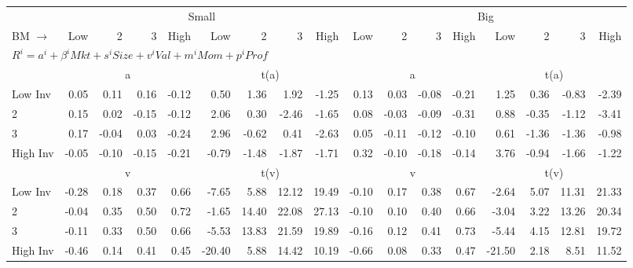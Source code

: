 
\begin{tabular}{lrrrrrrrrrrrrrrrr}
  \toprule
     & \multicolumn{8}{c}{Small} & \multicolumn{8}{c}{Big}  \\
     \cmidrule(r){2-9} \cmidrule(r){10-17}
    BM $\rightarrow$ & Low & 2 & 3 & High & Low & 2 & 3 & High & Low & 2 & 3 & High & Low & 2 & 3 & High  \\ 
  \midrule
  \multicolumn{17}{l}{$R^i=a^i+\beta^iMkt+s^iSize+v^iVal+m^iMom+p^iProf$}  \\
  
     & \multicolumn{4}{c}{a} & \multicolumn{4}{c}{t(a)}  & \multicolumn{4}{c}{a} & \multicolumn{4}{c}{t(a)}   \\
     \cmidrule(r){2-5} \cmidrule(r){6-9}  \cmidrule(r){10-13} \cmidrule(r){14-17} 
    Low Inv  & 0.05  & 0.11  & 0.16  & -0.12  & 0.50  & 1.36  & 1.92  & -1.25  & 0.13  & 0.03  & -0.08  & -0.21  & 1.25  & 0.36  & -0.83  & -2.39   \\
    2  & 0.15  & 0.02  & -0.15  & -0.12  & 2.06  & 0.30  & -2.46  & -1.65  & 0.08  & -0.03  & -0.09  & -0.31  & 0.88  & -0.35  & -1.12  & -3.41   \\
    3  & 0.17  & -0.04  & 0.03  & -0.24  & 2.96  & -0.62  & 0.41  & -2.63  & 0.05  & -0.11  & -0.12  & -0.10  & 0.61  & -1.36  & -1.36  & -0.98   \\
    High Inv  & -0.05  & -0.10  & -0.15  & -0.21  & -0.79  & -1.48  & -1.87  & -1.71  & 0.32  & -0.10  & -0.18  & -0.14  & 3.76  & -0.94  & -1.66  & -1.22   \\
    
  
     & \multicolumn{4}{c}{v} & \multicolumn{4}{c}{t(v)}  & \multicolumn{4}{c}{v} & \multicolumn{4}{c}{t(v)}   \\
     \cmidrule(r){2-5} \cmidrule(r){6-9}  \cmidrule(r){10-13} \cmidrule(r){14-17} 
    Low Inv  & -0.28  & 0.18  & 0.37  & 0.66  & -7.65  & 5.88  & 12.12  & 19.49  & -0.10  & 0.17  & 0.38  & 0.67  & -2.64  & 5.07  & 11.31  & 21.33   \\
    2  & -0.04  & 0.35  & 0.50  & 0.72  & -1.65  & 14.40  & 22.08  & 27.13  & -0.10  & 0.10  & 0.40  & 0.66  & -3.04  & 3.22  & 13.26  & 20.34   \\
    3  & -0.11  & 0.33  & 0.50  & 0.66  & -5.53  & 13.83  & 21.59  & 19.89  & -0.16  & 0.12  & 0.41  & 0.73  & -5.44  & 4.15  & 12.81  & 19.72   \\
    High Inv  & -0.46  & 0.14  & 0.41  & 0.45  & -20.40  & 5.88  & 14.42  & 10.19  & -0.66  & 0.08  & 0.33  & 0.47  & -21.50  & 2.18  & 8.51  & 11.52   \\
    

\end{tabular}
